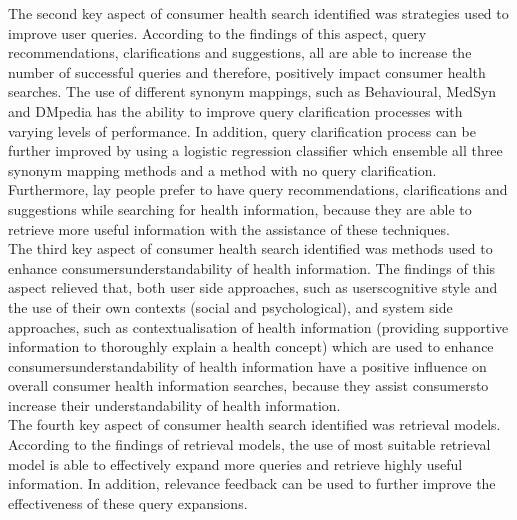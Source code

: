 \documentclass[]{article}
\begin{document}
The second key aspect of consumer health search identified was strategies used to improve user queries. According to the findings of this aspect, query recommendations, clarifications and suggestions, all are able to increase the number of successful queries and therefore, positively impact consumer health searches. The use of different synonym mappings, such as Behavioural, MedSyn and DMpedia has the ability to improve query clarification processes with varying levels of performance. In addition, query clarification process can be further improved by using a logistic regression classifier which ensemble all three synonym mapping methods and a method with no query clarification. Furthermore, lay people prefer to have query recommendations, clarifications and suggestions while searching for health information, because they are able to retrieve more useful information with the assistance of these techniques. \\

The third key aspect of consumer health search identified was methods used to enhance consumers\textquotesingle understandability of health information. The findings of this aspect relieved that, both user side approaches, such as users\textquotesingle cognitive style and the use of their own contexts (social and psychological), and system side approaches, such as contextualisation of health information (providing supportive information to thoroughly explain a health concept) which are used to enhance consumers\textquotesingle understandability of health information have a positive influence on overall consumer health information searches, because they assist consumers\textquotesingle to increase their understandability of health information.\\

The fourth key aspect of consumer health search identified was retrieval models. According to the findings of retrieval models, the use of most suitable retrieval model is able to effectively expand more queries and retrieve highly useful information. In addition, relevance feedback can be used to further improve the effectiveness of these query expansions.\\
\end{document}
